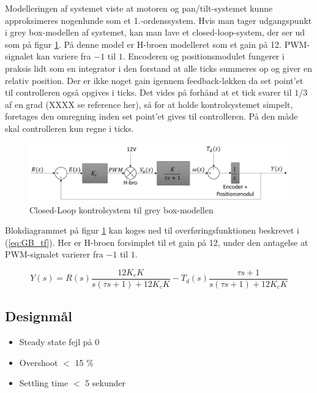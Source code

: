 Modelleringen af systemet viste at motoren og pan/tilt-systemet kunne approksimeres nogenlunde som et 1.-ordenssystem.
Hvis man tager udgangspunkt i grey box-modellen af systemet, kan man lave et closed-loop-system, der ser ud som på figur \ref{fig:GB_Model}. På denne model er H-broen modelleret som et gain på 12. PWM-signalet kan variere fra $-1$ til $1$. Encoderen og positionsmodulet fungerer i praksis lidt som en integrator i den forstand at alle ticks summeres op og giver en relativ position. Der er ikke noget gain igennem feedback-løkken da set point'et til controlleren også opgives i ticks. Det vides på forhånd at et tick svarer til $1/3$ af en grad (XXXX se reference her), så for at holde kontrolsystemet simpelt, foretages den omregning inden set point'et gives til controlleren. På den måde skal controlleren kun regne i ticks.

\begin{figure}[ht]
	\begin{center}
		\includegraphics[scale=0.5]{Billeder/Control_Loop.PNG}
	\end{center}
\caption{Closed-Loop kontrolsystem til grey box-modellen}
\label{fig:GB_Model}
\end{figure}

Blokdiagrammet på figur \ref{fig:GB_Model} kan koges ned til overføringsfunktionen beskrevet i (\ref{eq:GB_tf}). Her er H-broen forsimplet til et gain på 12, under den antagelse at PWM-signalet varierer fra $-1$ til $1$.

\begin{equation}\label{eq:GB_tf}
Y(s)=R(s)\frac{12K_{c}K}{s(\tau s+1)+12K_{c}K}-T_{d}(s)\frac{\tau s+1}{s(\tau s+1)+12K_{c}K}
\end{equation}

\subsection{Designmål}

\begin{itemize}

\item Steady state fejl på 0
\item Overshoot $<$ 15 $\%$
\item Settling time $<$ 5 sekunder

\end{itemize}

